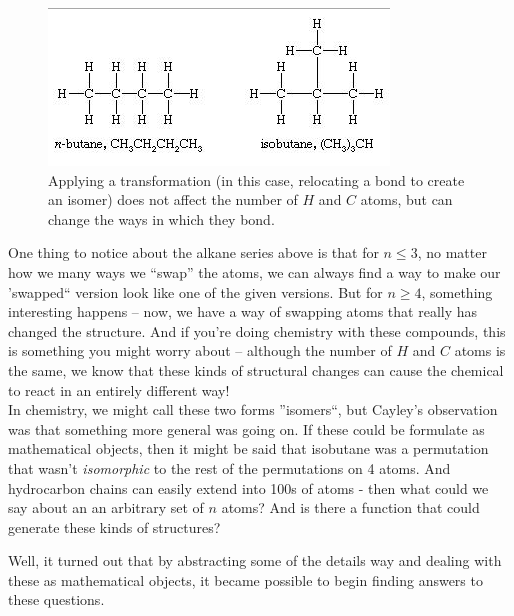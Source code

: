 \documentclass[a4paper,10pt]{report}
\begin{document}
\begin{figure}[H]
	\begin{centering}
	\begin{center}
	\includegraphics[width=\linewidth]{./Pictures/hydrocarbons.png}
	\caption{Applying a transformation (in this case, relocating a bond to create an isomer) does not affect the number of $H$ and $C$ atoms, but can change the ways in which they bond.}
	\label{fig:hydrocarbons}
	\end{center}
	\par\end{centering}
\end{figure}

One thing to notice about the alkane series above is that for $n\leq 3$, no matter how we many ways we ``swap'' the atoms, we can always find a way to make our 'swapped`` version look like one of the given versions. But for $n \geq 4$, something interesting happens -- now, we have a way of swapping atoms that really has changed the structure. And if you're doing chemistry with these compounds, this is something you might worry about -- although the number of $H$ and $C$ atoms is the same, we know that these kinds of structural changes can cause the chemical to react in an entirely different way!\\

In chemistry, we might call these two forms ''isomers``, but Cayley's observation was that something more general was going on. If these could be formulate as mathematical objects, then it might be said that isobutane was a permutation that wasn't \textit{isomorphic} to the rest of the permutations on 4 atoms. And hydrocarbon chains can easily extend into 100s of atoms - then what could we say about an an arbitrary set of $n$ atoms? And is there a function that could generate these kinds of structures?

Well, it turned out that by abstracting some of the details way and dealing with these as mathematical objects, it became possible to begin finding answers to these questions.
\end{document}
